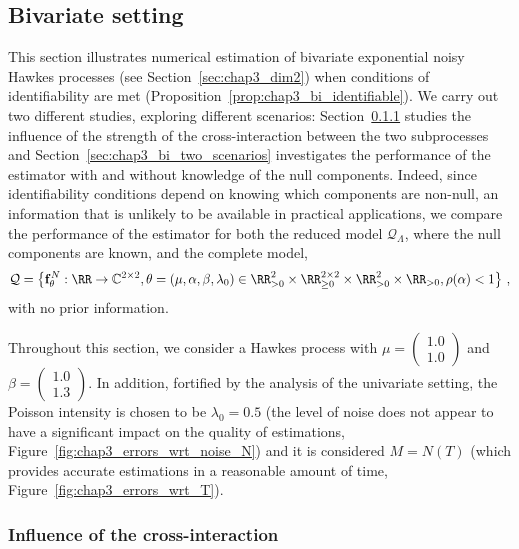 	\subsection{Bivariate setting} \label{sec:chap3_bivariate_numerical_results}
		This section illustrates numerical estimation of bivariate exponential noisy Hawkes processes (see Section~\ref{sec:chap3_dim2}) when conditions of identifiability are met (Proposition~\ref{prop:chap3_bi_identifiable}). We carry out two different studies, exploring different scenarios: Section~\ref{sec:chap3_bi_alpha_parameter} studies the influence of the strength of the cross-interaction between the two subprocesses and Section~\ref{sec:chap3_bi_two_scenarios} investigates the performance of the estimator with and without knowledge of the null components. Indeed, since identifiability conditions depend on knowing which components are non-null, an information that is unlikely to be available in practical applications, we compare the performance of the estimator for both the reduced model $\mathcal{Q}_{\Lambda}$, where the null components are known, and the complete model, \[\mathcal Q
        = \left\{
          \mathbf{f}_{\theta}^N : \RR \to \mathbb C^{2 \times 2},
          \theta = (\mu, \alpha, \beta, \lambda_0)
          \in \RR_{>0}^2\times \RR_{\geq 0}^{2\times 2} \times \RR_{>0}^2 \times \RR_{>0}, \rho(\alpha) < 1 
       	 \right\}\,,\]with no prior information.
		
    Throughout this section, we consider a Hawkes process with $\mu = \begin{pmatrix} 1.0 \\ 1.0 \end{pmatrix}$ and $\beta = \begin{pmatrix} 1.0 \\ 1.3 \end{pmatrix}$.
    In addition, fortified by the analysis of the univariate setting,
    the Poisson intensity is chosen to be $\lambda_0 = 0.5$
    (the level of noise does not appear to have a significant impact on the quality of estimations, Figure~\ref{fig:chap3_errors_wrt_noise_N})
    and it is considered $M = N(T)$ (which provides accurate estimations in a reasonable amount of time, Figure~\ref{fig:chap3_errors_wrt_T}).
		

		\subsubsection{Influence of the cross-interaction}
		\label{sec:chap3_bi_alpha_parameter} 

